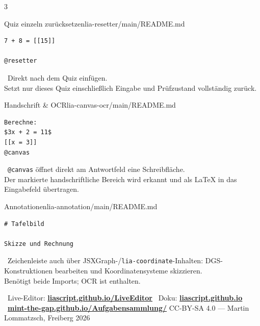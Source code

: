 \documentclass[a4paper,landscape,9pt]{extarticle}
\newcommand{\prevsm}[1]{{\footnotesize\color{muted} #1}}
\newcommand{\sheetfooter}{%
  \vfill
  {\sffamily\scriptsize\color{muted}
  \faInfoCircle~Live-Editor: \href{https://liascript.github.io/LiveEditor/}{\textbf{liascript.github.io/LiveEditor}}\hfill
  \faBook~Doku: \href{https://liascript.github.io}{\textbf{liascript.github.io}}\hfill
  \faGithub~\href{https://mint-the-gap.github.io/Aufgabensammlung/}{\textbf{mint-the-gap.github.io/Aufgabensammlung/}} \quad
  CC-BY-SA 4.0 — Martin Lommatzsch, Freiberg 2026}}
\begin{document}
\begin{multicols}{3}
\begin{schulcard}{Quiz einzeln zurücksetzen}{lia-resetter/main/README.md}
\begin{lstlisting}[language=lia]
7 + 8 = [[15]]

@resetter
\end{lstlisting}
\tcblower
\prevsm{\faUndo~Direkt nach dem Quiz einfügen.\\[2pt]
Setzt nur dieses Quiz einschließlich Eingabe und Prüfzustand vollständig zurück.}
\end{schulcard}

\begin{schulcard}{Handschrift \& OCR}{lia-canvas-ocr/main/README.md}
\begin{lstlisting}[language=lia]
Berechne:
$3x + 2 = 11$
[[x = 3]]
@canvas
\end{lstlisting}
\tcblower
\prevsm{\faPen~\texttt{@canvas} öffnet direkt am Antwortfeld eine Schreibfläche.\\[2pt]
Der markierte handschriftliche Bereich wird erkannt und als LaTeX in das Eingabefeld übertragen.}
\end{schulcard}

\begin{schulcard}{Annotationen}{lia-annotation/main/README.md}
\begin{lstlisting}[language=lia]
# Tafelbild

Skizze und Rechnung
\end{lstlisting}
\tcblower
\prevsm{\faPen~Zeichenleiste auch über JSXGraph-/\texttt{lia-coordinate}-Inhalten: DGS-Konstruktionen bearbeiten und Koordinatensysteme skizzieren.\\[2pt]
{\footnotesize Benötigt beide Imports; OCR ist enthalten.}}
\end{schulcard}

\end{multicols}

\sheetfooter

\newpage
\end{document}
